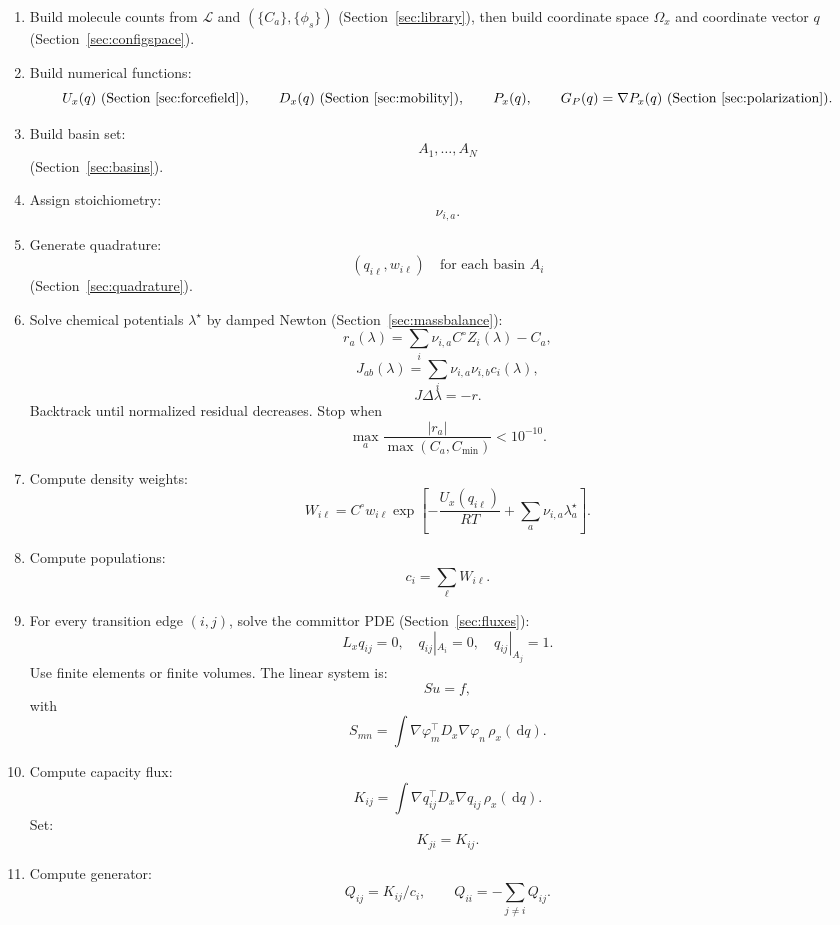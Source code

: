 \documentclass[11pt]{article}
\newcommand{\dd}{\,\mathrm d}
\begin{document}
\begin{enumerate}

\item Build molecule counts from \(\mathcal L\) and \((\{C_a\},\{\phi_s\})\)
(Section~\ref{sec:library}), then build coordinate space \(\Omega_x\) and
coordinate vector \(q\) (Section~\ref{sec:configspace}).

\item Build numerical functions:
\[
U_x(q)\ (\text{Section~\ref{sec:forcefield}}),
\qquad
D_x(q)\ (\text{Section~\ref{sec:mobility}}),
\qquad
P_x(q),
\qquad
G_P(q)=\nabla P_x(q)\ (\text{Section~\ref{sec:polarization}}).
\]

\item Build basin set:
\[
A_1,\ldots,A_N
\]
(Section~\ref{sec:basins}).

\item Assign stoichiometry:
\[
\nu_{i,a}.
\]

\item Generate quadrature:
\[
(q_{i\ell},w_{i\ell})
\quad
\text{for each basin }A_i
\]
(Section~\ref{sec:quadrature}).

\item Solve chemical potentials \(\lambda^\star\) by damped Newton
(Section~\ref{sec:massbalance}):
\[
r_a(\lambda)=\sum_i\nu_{i,a}C^\circ Z_i(\lambda)-C_a,
\]
\[
J_{ab}(\lambda)=\sum_i\nu_{i,a}\nu_{i,b}c_i(\lambda),
\]
\[
J\Delta\lambda=-r.
\]
Backtrack until normalized residual decreases. Stop when
\[
\max_a\frac{|r_a|}{\max(C_a,C_{\min})}<10^{-10}.
\]

\item Compute density weights:
\[
W_{i\ell}
=
C^\circ
w_{i\ell}
\exp
\left[
-\frac{U_x(q_{i\ell})}{RT}
+
\sum_a\nu_{i,a}\lambda_a^\star
\right].
\]

\item Compute populations:
\[
c_i=\sum_\ell W_{i\ell}.
\]

\item For every transition edge \((i,j)\), solve the committor PDE
(Section~\ref{sec:fluxes}):
\[
L_xq_{ij}=0,
\quad
q_{ij}|_{A_i}=0,
\quad
q_{ij}|_{A_j}=1.
\]
Use finite elements or finite volumes. The linear system is:
\[
S u=f,
\]
with
\[
S_{mn}
=
\int
\nabla\varphi_m^\top D_x\nabla\varphi_n
\,\rho_x(\dd q).
\]

\item Compute capacity flux:
\[
K_{ij}
=
\int
\nabla q_{ij}^\top D_x\nabla q_{ij}
\,\rho_x(\dd q).
\]
Set:
\[
K_{ji}=K_{ij}.
\]

\item Compute generator:
\[
Q_{ij}=K_{ij}/c_i,
\qquad
Q_{ii}=-\sum_{j\ne i}Q_{ij}.
\]


\end{enumerate}
\end{document}
